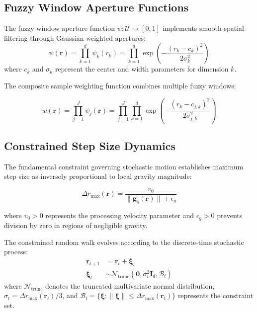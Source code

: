\subsection{Fuzzy Window Aperture Functions}

\begin{definition}
The fuzzy window aperture function $\psi: \mathcal{U} \to [0,1]$ implements smooth spatial filtering through Gaussian-weighted apertures:
\begin{equation}
\psi(\mathbf{r}) = \prod_{k=1}^d \psi_k(r_k) = \prod_{k=1}^d \exp\left(-\frac{(r_k - c_k)^2}{2\sigma_k^2}\right)
\label{eq:fuzzy-window}
\end{equation}
where $c_k$ and $\sigma_k$ represent the center and width parameters for dimension $k$.
\end{definition}

The composite sample weighting function combines multiple fuzzy windows:

\begin{equation}
w(\mathbf{r}) = \prod_{j=1}^J \psi_j(\mathbf{r}) = \prod_{j=1}^J \prod_{k=1}^d \exp\left(-\frac{(r_k - c_{j,k})^2}{2\sigma_{j,k}^2}\right)
\label{eq:composite-weight}
\end{equation}

\subsection{Constrained Step Size Dynamics}

The fundamental constraint governing stochastic motion establishes maximum step size as inversely proportional to local gravity magnitude:

\begin{equation}
\Delta r_{\max}(\mathbf{r}) = \frac{v_0}{\|\mathbf{g}_s(\mathbf{r})\| + \epsilon_g}
\label{eq:step-constraint}
\end{equation}

where $v_0 > 0$ represents the processing velocity parameter and $\epsilon_g > 0$ prevents division by zero in regions of negligible gravity.

\begin{definition}
The constrained random walk evolves according to the discrete-time stochastic process:
\begin{align}
\mathbf{r}_{t+1} &= \mathbf{r}_t + \boldsymbol{\xi}_t \label{eq:stochastic-evolution}\\
\boldsymbol{\xi}_t &\sim \mathcal{N}_{\text{trunc}}\left(\mathbf{0}, \sigma_t^2 \mathbf{I}_d, \mathcal{B}_t\right) \label{eq:truncated-normal}
\end{align}
where $\mathcal{N}_{\text{trunc}}$ denotes the truncated multivariate normal distribution, $\sigma_t = \Delta r_{\max}(\mathbf{r}_t)/3$, and $\mathcal{B}_t = \{\boldsymbol{\xi}: \|\boldsymbol{\xi}\| \leq \Delta r_{\max}(\mathbf{r}_t)\}$ represents the constraint set.
\end{definition}

